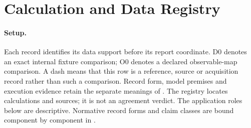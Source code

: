 \section{Calculation and Data Registry}\label{manual2:prediction-test-registry}
\paragraph{Setup.}
Each record identifies its data support before its report coordinate. D0 denotes
an exact internal fixture comparison; O0 denotes a declared observable-map
comparison. A dash means that this row is a reference, source or acquisition
record rather than such a comparison. Record form, model premises and execution
evidence retain the separate meanings of . The
registry locates calculations and sources; it is not an agreement verdict.
The application roles below are descriptive. Normative record forms and claim
classes are bound component by component in
.


